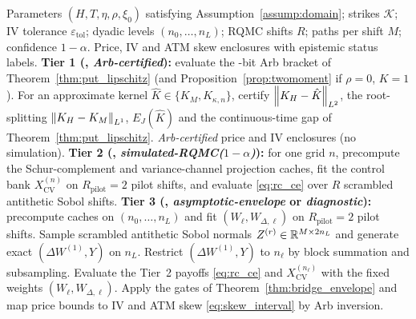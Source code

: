 \begin{widealgorithm}[t]
\caption{\RoughCertSPX{} tiered pricing and audit pipeline.}
\label{alg:roughcert_spx}
\begin{algorithmic}[1]
\Require Parameters $(H,T,\eta,\rho,\xi_0)$ satisfying Assumption~\ref{assump:domain}; strikes $\mathcal{K}$; IV tolerance $\varepsilon_{\mathrm{tol}}$; dyadic levels $(n_0,\dots,n_L)$; RQMC shifts $R$; paths per shift $M$; confidence $1-\alpha$.
\Ensure Price, IV and ATM skew enclosures with epistemic status labels.
\State \textbf{Tier 1 (\RCDet{}, \emph{Arb-certified}):} evaluate the \ArbBits-bit Arb bracket of Theorem~\ref{thm:put_lipschitz} (and Proposition~\ref{prop:twomoment} if $\rho=0$, $K=1$). For an approximate kernel $\hat{K}\in\{K_M,K_{\kappa,n}\}$, certify $\left\lVert K_H-\hat{K}\right\rVert_{L^2}$, the root-splitting $\left\lVert K_H-K_M\right\rVert_{L^1}$, $E_J(\hat{K})$ and the continuous-time gap of Theorem~\ref{thm:put_lipschitz}.
  \State \Return \emph{Arb-certified} price and IV enclosures (no simulation).
\EndIf
\State \textbf{Tier 2 (\RCCE{}, \emph{simulated-RQMC($1-\alpha$)}):} for one grid $n$, precompute the Schur-complement and variance-channel projection caches, fit the control bank $X_{\mathrm{CV}}^{(n)}$ on $R_{\mathrm{pilot}}=2$ pilot shifts, and evaluate \eqref{eq:rc_ce} over $R$ scrambled antithetic Sobol shifts.
\State \textbf{Tier 3 (\RCBridge{}, \emph{asymptotic-envelope} or \emph{diagnostic}):} precompute caches on $(n_0,\dots,n_L)$ and fit $(W_\ell,W_{\Delta,\ell})$ on $R_{\mathrm{pilot}}=2$ pilot shifts.
  \State Sample scrambled antithetic Sobol normals $Z^{(r)}\in\mathbb{R}^{M\times 2n_L}$ and generate exact $(\Delta W^{(1)},Y)$ on $n_L$.
    \State Restrict $(\Delta W^{(1)},Y)$ to $n_\ell$ by block summation and subsampling.
    \State Evaluate the Tier~2 payoffs \eqref{eq:rc_ce} and $X_{\mathrm{CV}}^{(n_\ell)}$ with the fixed weights $(W_\ell,W_{\Delta,\ell})$.
  \EndFor
\EndFor
\State Apply the gates of Theorem~\ref{thm:bridge_envelope} and map price bounds to IV and ATM skew \eqref{eq:skew_interval} by Arb inversion.
\end{algorithmic}
\end{widealgorithm}
